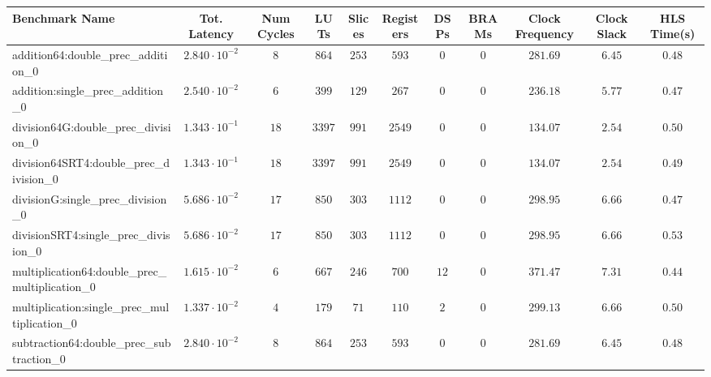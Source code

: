 \begin{tabular}{|l|c|c|c|c|c|c|c|c|c|c|}
\hline
Benchmark Name                                   & Tot. Latency            & Num Cycles & LUTs      & Slices   & Registers & DSPs   & BRAMs & Clock Frequency & Clock Slack & HLS Time(s) \\
\hline
addition64:double\_prec\_addition\_0             & $ 2.840 \cdot 10^{-2} $ & $ 8      $ & $ 864   $ & $ 253  $ & $ 593   $ & $ 0  $ & $ 0 $ & $ 281.69      $ & $ 6.45    $ & $ 0.48    $ \\
addition:single\_prec\_addition\_0               & $ 2.540 \cdot 10^{-2} $ & $ 6      $ & $ 399   $ & $ 129  $ & $ 267   $ & $ 0  $ & $ 0 $ & $ 236.18      $ & $ 5.77    $ & $ 0.47    $ \\
division64G:double\_prec\_division\_0            & $ 1.343 \cdot 10^{-1} $ & $ 18     $ & $ 3397  $ & $ 991  $ & $ 2549  $ & $ 0  $ & $ 0 $ & $ 134.07      $ & $ 2.54    $ & $ 0.50    $ \\
division64SRT4:double\_prec\_division\_0         & $ 1.343 \cdot 10^{-1} $ & $ 18     $ & $ 3397  $ & $ 991  $ & $ 2549  $ & $ 0  $ & $ 0 $ & $ 134.07      $ & $ 2.54    $ & $ 0.49    $ \\
divisionG:single\_prec\_division\_0              & $ 5.686 \cdot 10^{-2} $ & $ 17     $ & $ 850   $ & $ 303  $ & $ 1112  $ & $ 0  $ & $ 0 $ & $ 298.95      $ & $ 6.66    $ & $ 0.47    $ \\
divisionSRT4:single\_prec\_division\_0           & $ 5.686 \cdot 10^{-2} $ & $ 17     $ & $ 850   $ & $ 303  $ & $ 1112  $ & $ 0  $ & $ 0 $ & $ 298.95      $ & $ 6.66    $ & $ 0.53    $ \\
multiplication64:double\_prec\_multiplication\_0 & $ 1.615 \cdot 10^{-2} $ & $ 6      $ & $ 667   $ & $ 246  $ & $ 700   $ & $ 12 $ & $ 0 $ & $ 371.47      $ & $ 7.31    $ & $ 0.44    $ \\
multiplication:single\_prec\_multiplication\_0   & $ 1.337 \cdot 10^{-2} $ & $ 4      $ & $ 179   $ & $ 71   $ & $ 110   $ & $ 2  $ & $ 0 $ & $ 299.13      $ & $ 6.66    $ & $ 0.50    $ \\
subtraction64:double\_prec\_subtraction\_0       & $ 2.840 \cdot 10^{-2} $ & $ 8      $ & $ 864   $ & $ 253  $ & $ 593   $ & $ 0  $ & $ 0 $ & $ 281.69      $ & $ 6.45    $ & $ 0.48    $ \\

\end{tabular}
